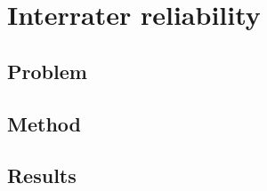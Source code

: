 \chapter{Interrater reliability}

\section{Problem}

\cite{davies1982measuring}

\section{Method}

\section{Results}
